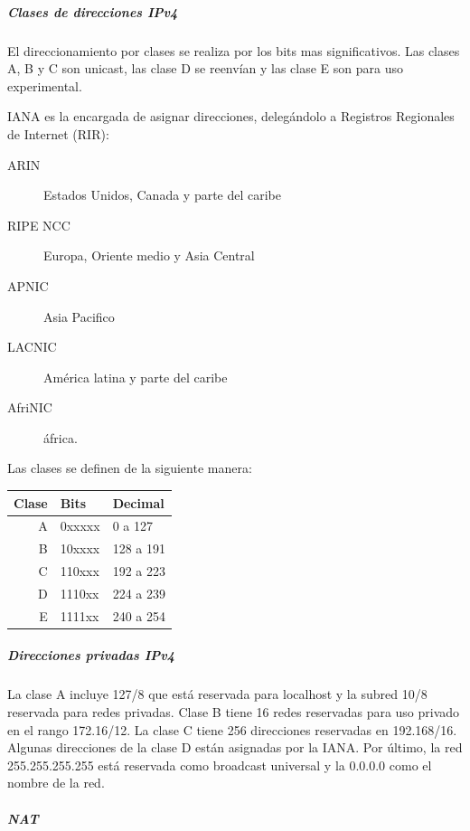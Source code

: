             \subparagraph{Clases de direcciones IPv4} 
                El direccionamiento por clases se realiza por los bits mas significativos. Las clases A, B y C son unicast, las clase D se reenvían y las clase E son para uso experimental. 

                IANA es la encargada de asignar direcciones, delegándolo a Registros Regionales de Internet (RIR):
                \begin{description}
                    \item[ARIN] Estados Unidos, Canada y parte del caribe
                    \item[RIPE NCC] Europa, Oriente medio y Asia Central
                    \item[APNIC] Asia Pacifico
                    \item[LACNIC] América latina y parte del caribe
                    \item[AfriNIC] áfrica.
                \end{description}

                Las clases se definen de la siguiente manera:
                \begin{table}[H]
                \begin{tabular}{rll}
                    Clase & Bits & Decimal \\
                    \midrule
                    A & 0xxxxx &   0 a 127 \\
                    B & 10xxxx & 128 a 191 \\
                    C & 110xxx & 192 a 223 \\
                    D & 1110xx & 224 a 239 \\
                    E & 1111xx & 240 a 254 \\
                \end{tabular}
                \end{table}
            \subparagraph{Direcciones privadas IPv4}

                La clase A incluye 127/8 que está reservada para localhost y la subred 10/8 reservada para redes privadas. Clase B tiene 16 redes reservadas para uso privado en el rango 172.16/12. La clase C tiene 256 direcciones reservadas en 192.168/16. Algunas direcciones de la clase D están asignadas por la IANA. Por último, la red 255.255.255.255 está reservada como broadcast universal y la 0.0.0.0 como el nombre de la red.

            \subparagraph{NAT}

